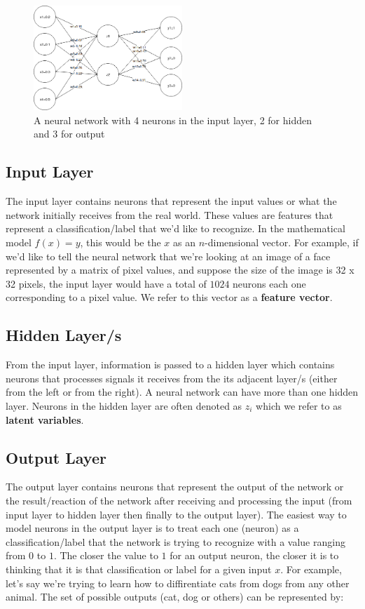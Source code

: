 \documentclass[a4paper]{article}
\begin{document}
\begin{figure}[!htb]
\centering
\includegraphics[width=0.5\textwidth]{neural_network.png}
\caption{\label{fig:neuron}A neural network with 4 neurons in the input layer, 2 for hidden and 3 for output}
\end{figure}

\subsection{Input Layer}
The input layer contains neurons that represent the input values or what the network initially receives from the real world. These values are features that represent a classification/label that we'd like to recognize. In the mathematical model $f(x) = y$, this would be the $x$ as an $n$-dimensional vector. For example, if we'd like to tell the neural network that we're looking at an image of a face represented by a matrix of pixel values, and suppose the size of the image is 32 x 32 pixels, the input layer would have a total of $1024$ neurons each one corresponding to a pixel value. We refer to this vector as a \textbf{feature vector}.

\subsection{Hidden Layer/s}
From the input layer, information is passed to a hidden layer which contains neurons that processes signals it receives from the its adjacent layer/s (either from the left or from the right). A neural network can have more than one hidden layer. Neurons in the hidden layer are often denoted as $z_{i}$ which we refer to as \textbf{latent variables}.

\subsection{Output Layer}
The output layer contains neurons that represent the output of the network or the result/reaction of the network after receiving and processing the input (from input layer to hidden layer then finally to the output layer). The easiest way to model neurons in the output layer is to treat each one (neuron) as a classification/label that the network is trying to recognize with a value ranging from $0$ to $1$. The closer the value to $1$ for an output neuron, the closer it is to thinking that it is that classification or label for a given input $x$. For example, let's say we're trying to learn how to diffirentiate cats from dogs from any other animal. The set of possible outputs (cat, dog or others) can be represented by:
\end{document}
